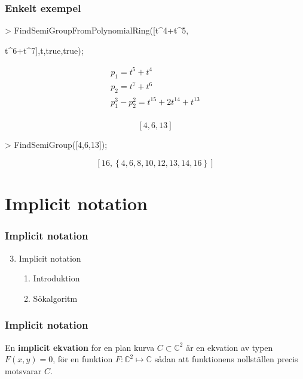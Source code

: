 \documentclass{beamer}
\begin{document}
\begin{frame}
	\frametitle{Enkelt exempel}
	
	\begin{example}
		\begin{semiverbatim}
			> FindSemiGroupFromPolynomialRing([t\^{}4+t\^{}5,

\qquad t\^{}6+t\^{}7],t,true,true);
		\end{semiverbatim}
\[\begin{array}{c}
p_1 = t^5 + t^4\\[3pt]
p_2 = t^7 + t^6\\[3pt]
p_1^3 - p_2^2 = t^{15} + 2 t^{14} + t^{13}\\
\end{array}\]

\[\left[4, 6, 13\right]\]

\begin{semiverbatim}
> FindSemiGroup([4,6,13]);
\end{semiverbatim}
\[\left[16, \left\{4, 6, 8, 10, 12, 13, 14, 16\right\}\right]\]
	\end{example}
\end{frame}



\section{Implicit notation}


\begin{frame}
	\frametitle{Implicit notation}
	\begin{enumerate}
		\setcounter{enumi}{2}
		\item<1-> Implicit notation
		\begin{enumerate}
			\item<2-> Introduktion
			\item<3-> Sökalgoritm
		\end{enumerate}
	\end{enumerate}
\end{frame}

\begin{frame}
	\frametitle{Implicit notation}
	
	\begin{definition}
		En \textbf{implicit ekvation} for en plan kurva $C \subset \mathbb{C}^2$ är en ekvation av typen $F(x,y)=0$, för en funktion $F: \mathbb{C}^2 \mapsto \mathbb{C}$ sådan att funktionens nollställen precis motsvarar $C$.
	\end{definition}
		
	\vspace{20pt}
\end{frame}
\end{document}
